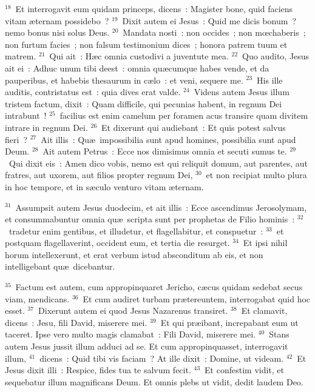 ${}^{18}$~Et interrogavit eum quidam princeps, dicens~: Magister bone, quid faciens vitam \ae ternam possidebo~?
${}^{19}$~Dixit autem ei Jesus~: Quid me dicis bonum~? nemo bonus nisi solus Deus.
${}^{20}$~Mandata nosti~: non occides~; non mœchaberis~; non furtum facies~; non falsum testimonium dices~; honora patrem tuum et matrem.
${}^{21}$~Qui ait~: H\ae c omnia custodivi a juventute mea.
${}^{22}$~Quo audito, Jesus ait ei~: Adhuc unum tibi deest~: omnia qu\ae cumque habes vende, et da pauperibus, et habebis thesaurum in c\ae lo~: et veni, sequere me.
${}^{23}$~His ille auditis, contristatus est~: quia dives erat valde.
${}^{24}$~Videns autem Jesus illum tristem factum, dixit~: Quam difficile, qui pecunias habent, in regnum Dei intrabunt~!
${}^{25}$~facilius est enim camelum per foramen acus transire quam divitem intrare in regnum Dei.
${}^{26}$~Et dixerunt qui audiebant~: Et quis potest salvus fieri~?
${}^{27}$~Ait illis~: Qu\ae\ impossibilia sunt apud homines, possibilia sunt apud Deum.
${}^{28}$~Ait autem Petrus~: Ecce nos dimisimus omnia et secuti sumus te.
${}^{29}$~Qui dixit eis~: Amen dico vobis, nemo est qui reliquit domum, aut parentes, aut fratres, aut uxorem, aut filios propter regnum Dei,
${}^{30}$~et non recipiat multo plura in hoc tempore, et in s\ae culo venturo vitam \ae ternam.


${}^{31}$~Assumpsit autem Jesus duodecim, et ait illis~: Ecce ascendimus Jerosolymam, et consummabuntur omnia qu\ae\ scripta sunt per prophetas de Filio hominis~:
${}^{32}$~tradetur enim gentibus, et illudetur, et flagellabitur, et conspuetur~:
${}^{33}$~et postquam flagellaverint, occident eum, et tertia die resurget.
${}^{34}$~Et ipsi nihil horum intellexerunt, et erat verbum istud absconditum ab eis, et non intelligebant qu\ae\ dicebantur.


${}^{35}$~Factum est autem, cum appropinquaret Jericho, c\ae cus quidam sedebat secus viam, mendicans.
${}^{36}$~Et cum audiret turbam pr\ae tereuntem, interrogabat quid hoc esset.
${}^{37}$~Dixerunt autem ei quod Jesus Nazarenus transiret.
${}^{38}$~Et clamavit, dicens~: Jesu, fili David, miserere mei.
${}^{39}$~Et qui pr\ae ibant, increpabant eum ut taceret. Ipse vero multo magis clamabat~: Fili David, miserere mei.
${}^{40}$~Stans autem Jesus jussit illum adduci ad se. Et cum appropinquasset, interrogavit illum,
${}^{41}$~dicens~: Quid tibi vis faciam~? At ille dixit~: Domine, ut videam.
${}^{42}$~Et Jesus dixit illi~: Respice, fides tua te salvum fecit.
${}^{43}$~Et confestim vidit, et sequebatur illum magnificans Deum. Et omnis plebs ut vidit, dedit laudem Deo.

